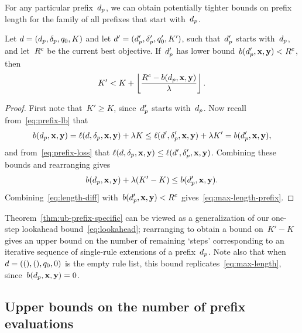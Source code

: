 For any particular prefix~$d_p$, we can obtain potentially tighter bounds on
prefix length for the family of all prefixes that start with~$d_p$.

\begin{theorem}
\label{thm:ub-prefix-specific}
Let ${{d} = (d_p, \delta_p, q_0, K)}$
and let ${{d}' = (d_p', \delta_p', q_0', K')}$,
such that~$d_p'$ starts with~$d_p$,
and let~${R^c}$ be the current best objective.
%
If~$d_p'$ has lower bound~${b(d_p', \mathbf{x}, \mathbf{y}) < {R^c}}$, then
\begin{align}
K' < K + \left\lfloor \frac{\CurrentObj - b(\Prefix, \x, \y)}{\Reg} \right\rfloor.
\label{eq:max-length-prefix}
\end{align}
\end{theorem}

\begin{proof}
First note that~${K' \ge K}$, since~$d_p'$ starts with~$d_p$.
%
Now recall from~\eqref{eq:prefix-lb} that
%
\begin{align}
b(\Prefix, \x, \y) = \Loss(\RL, \Labels, \x, \y) + \Reg K
\le \Loss(\RL', \Labels', \x, \y) + \Reg K' = b(\Prefix', \x, \y),
\end{align}
%
and from~\eqref{eq:prefix-loss} that
${\ell({d}, \delta_p, \mathbf{x}, \mathbf{y}) \le \ell({d}', \delta_p', \mathbf{x}, \mathbf{y})}$.
%
Combining these bounds and rearranging gives
\begin{align}
b(\Prefix, \x, \y) + \Reg (K' - K) \le b(\Prefix', \x, \y).
\label{eq:length-diff}
\end{align}
Combining~\eqref{eq:length-diff} with~${b(d_p', \mathbf{x}, \mathbf{y}) < {R^c}}$
gives~\eqref{eq:max-length-prefix}.
\end{proof}

Theorem~\ref{thm:ub-prefix-specific} can be viewed as a generalization
of our one-step lookahead bound~\eqref{eq:lookahead};
rearranging to obtain a bound on~${K' - K}$
gives an upper bound on the number of remaining `steps' corresponding
to an iterative sequence of single-rule extensions of a prefix~$d_p$.
%
Note also that when~${{d} = ((), (), q_0, 0)}$ is the empty rule list,
this bound replicates~\eqref{eq:max-length}, since~${b(d_p, \mathbf{x}, \mathbf{y}) = 0}$.

\subsection{Upper bounds on the number of prefix evaluations}
\label{sec:ub-size}

